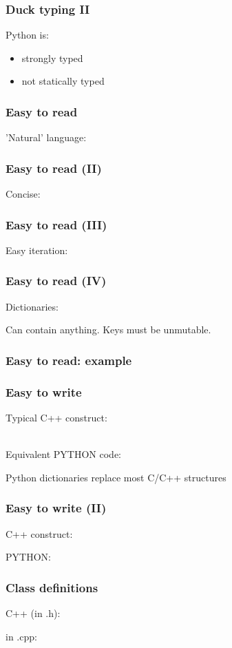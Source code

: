 \documentclass[14pt]{beamer}
\begin{document}
\begin{frame}
\frametitle{Duck typing II}
Python is:
\begin{itemize}
\item strongly typed

\item not statically typed

\end{itemize}
\end{frame}

\begin{frame}
\frametitle{Easy to read}
'Natural' language:

\end{frame}

\begin{frame}
\frametitle{Easy to read (II)}
Concise:

\end{frame}

\begin{frame}
\frametitle{Easy to read (III)}
Easy iteration:

\end{frame}

\begin{frame}
\frametitle{Easy to read (IV)}
Dictionaries:

Can contain anything. Keys must be unmutable.
\end{frame}

\begin{frame}
\frametitle{Easy to read: example}

\end{frame}

\begin{frame}
\frametitle{Easy to write}
Typical C++ construct:

~\\
Equivalent PYTHON code:

Python dictionaries replace most C/C++ structures
\end{frame}

\begin{frame}
\frametitle{Easy to write (II)}
C++ construct:

PYTHON:

\end{frame}

\begin{frame}
\frametitle{Class definitions}
C++ (in .h):

in .cpp:

\end{frame}
\end{document}
